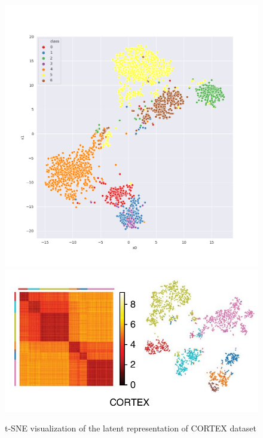 \begin{figure}
    \centering
    \includegraphics[width=\linewidth]{images/sc_data_VAE.png}
    \includegraphics[width=\linewidth]{images/scVI_plot.png}
    \caption{t-SNE visualization of the latent representation of CORTEX dataset}
    \label{fig:cortex}
\end{figure}
